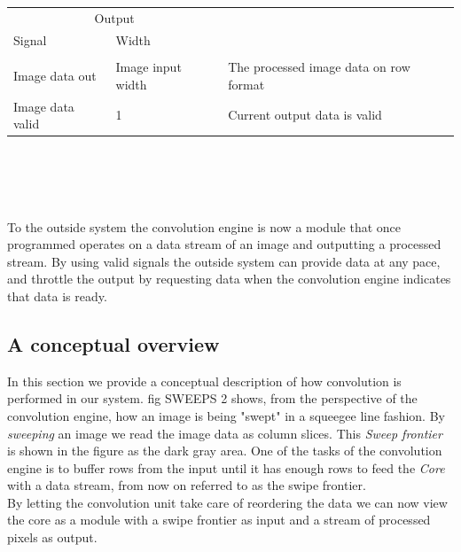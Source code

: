 \\ \\ \\ \\
\begin{tabular}{ l | l | l}
    \multicolumn{2}{c}{Output}
    \hline \\
    Signal & Width\\
    \hline \\
    Image data out          & Image input width     & The processed image data on row format\\
    Image data valid        & 1                     & Current output data is valid
\end{tabular}
\\ \\ \\ \\
To the outside system the convolution engine is now a module that once programmed operates on a data stream of an image and outputting a processed stream. 
By using valid signals the outside system can provide data at any pace, and throttle the output by requesting data when the convolution engine indicates that data is ready. 

\subsection{A conceptual overview}
In this section we provide a conceptual description of how convolution is performed in our system.
fig SWEEPS 2 shows, from the perspective of the convolution engine, how an image is being "swept" in a squeegee line fashion.
By \textit{sweeping} an image we read the image data as column slices. This \textit{Sweep frontier} is shown in the figure as the dark gray area. 
One of the tasks of the convolution engine is to buffer rows from the input until it has enough rows to feed the \textit{Core} with a data stream, from now on referred to as the swipe frontier.\\
By letting the convolution unit take care of reordering the data we can now view the core as a module with a swipe frontier as input and a stream of processed pixels as output.

